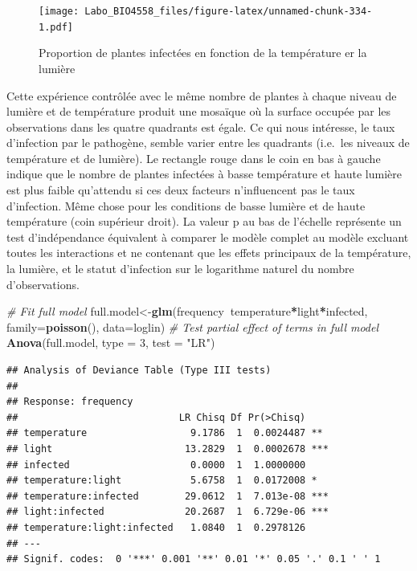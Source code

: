 \documentclass[12pt,]{book}
\newenvironment{Shaded}{\begin{snugshade}}{\end{snugshade}}
\newcommand{\CommentTok}[1]{\textcolor[rgb]{0.56,0.35,0.01}{\textit{#1}}}
\newcommand{\DataTypeTok}[1]{\textcolor[rgb]{0.13,0.29,0.53}{#1}}
\newcommand{\DecValTok}[1]{\textcolor[rgb]{0.00,0.00,0.81}{#1}}
\newcommand{\KeywordTok}[1]{\textcolor[rgb]{0.13,0.29,0.53}{\textbf{#1}}}
\newcommand{\NormalTok}[1]{#1}
\newcommand{\OperatorTok}[1]{\textcolor[rgb]{0.81,0.36,0.00}{\textbf{#1}}}
\newcommand{\StringTok}[1]{\textcolor[rgb]{0.31,0.60,0.02}{#1}}
\begin{document}
\begin{figure}
\centering
\texttt{[image: Labo\_BIO4558\_files/figure-latex/unnamed-chunk-334-1.pdf]}
\caption{\label{fig:unnamed-chunk-334}Proportion de plantes infectées en fonction de la température er la lumière}
\end{figure}

Cette expérience contrôlée avec le même nombre de plantes à chaque niveau de lumière et de température produit une mosaïque où la surface occupée par les observations dans les quatre quadrants est égale. Ce qui nous intéresse, le taux d'infection par le pathogène, semble varier entre les quadrants (i.e.~les niveaux de température et de lumière). Le rectangle rouge dans le coin en bas à gauche indique que le nombre de plantes infectées à basse température et haute lumière est plus faible qu'attendu si ces deux facteurs n'influencent pas le taux d'infection. Même chose pour les conditions de basse lumière et de haute température (coin supérieur droit). La valeur p au bas de l'échelle représente un test d'indépendance équivalent à comparer le modèle complet au modèle excluant toutes les interactions et ne contenant que les effets principaux de la température, la lumière, et le statut d'infection sur le logarithme naturel du nombre d'observations.

\begin{Shaded}
\begin{Highlighting}[]
\CommentTok{# Fit full model}
\NormalTok{full.model<-}\KeywordTok{glm}\NormalTok{(frequency}\OperatorTok{~}\NormalTok{temperature}\OperatorTok{*}\NormalTok{light}\OperatorTok{*}\NormalTok{infected, }\DataTypeTok{family=}\KeywordTok{poisson}\NormalTok{(), }\DataTypeTok{data=}\NormalTok{loglin)}
\CommentTok{# Test partial effect of terms in full model}
\KeywordTok{Anova}\NormalTok{(full.model, }\DataTypeTok{type =} \DecValTok{3}\NormalTok{, }\DataTypeTok{test =} \StringTok{"LR"}\NormalTok{)}
\end{Highlighting}
\end{Shaded}

\begin{verbatim}
## Analysis of Deviance Table (Type III tests)
## 
## Response: frequency
##                            LR Chisq Df Pr(>Chisq)    
## temperature                  9.1786  1  0.0024487 ** 
## light                       13.2829  1  0.0002678 ***
## infected                     0.0000  1  1.0000000    
## temperature:light            5.6758  1  0.0172008 *  
## temperature:infected        29.0612  1  7.013e-08 ***
## light:infected              20.2687  1  6.729e-06 ***
## temperature:light:infected   1.0840  1  0.2978126    
## ---
## Signif. codes:  0 '***' 0.001 '**' 0.01 '*' 0.05 '.' 0.1 ' ' 1
\end{verbatim}
\end{document}
